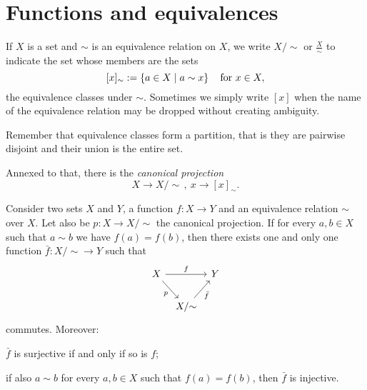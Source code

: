 
\section{Functions and equivalences}

If \(X\) is a set and \(\sim\) is an equivalence relation on \(X\), we write \(X{/}{\sim}\) or \(\frac X \sim\) to indicate the set whose members are the sets
\[[x]_{\sim} := \left\{a \in X \mid a \sim x\right\} \quad \text{for } x \in X ,\]
the equivalence classes under \(\sim\). Sometimes we simply write \([x]\) when the name of the equivalence relation may be dropped without creating ambiguity.

Remember that equivalence classes form a partition, that is they are pairwise disjoint and their union is the entire set.

Annexed to that, there is the {\em canonical projection}
\[X \to X{/}{\sim}\,,\ x \to [x]_{\sim} .\]

\begin{proposition}\label{proposition:SetIso1}
Consider two sets \(X\) and \(Y\), a function \(f : X \to Y\) and an equivalence relation \(\sim\) over \(X\). Let also be \(p : X \to X{/}{\sim}\) the canonical projection. If for every \(a, b \in X\) such that \(a \sim b\) we have \(f(a) = f(b)\),
then there exists one and only one function \(\bar f : X{/}{\sim} \to Y\) such that
\[\begin{tikzcd}[column sep=tiny]
X \ar["f", rr] \ar["p", swap, dr] & & Y \\
& X{/}{\sim} \ar["{\bar f}", swap, ur]
\end{tikzcd}\]
commutes. Moreover: 
\begin{tcbenum}
\item \(\bar f\) is surjective if and only if so is \(f\);
\item if also \(a \sim b\) for every \(a, b \in X\) such that \(f(a) = f(b)\),
then \(\bar f\) is injective.
\end{tcbenum}
\end{proposition}

